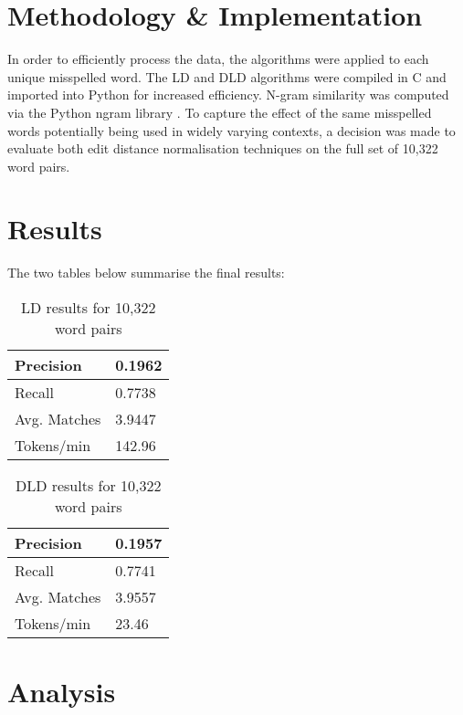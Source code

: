 \documentclass[11pt]{article}
\begin{document}
\section{Methodology \& Implementation}
In order to efficiently process the data, the algorithms were applied to each unique misspelled word.
The LD and DLD \cite{Pedro Rittner} algorithms were compiled in C and imported into Python for increased efficiency. N-gram
similarity was computed via the Python ngram library \cite{Poulter}. To capture the effect of the same misspelled words potentially being used in widely varying contexts, a decision was made to evaluate both edit distance normalisation techniques on the full set of 10,322 word pairs. 


\section{Results}
The two tables below summarise the final results:

\begin{table}[h]
\begin{center}
\begin{tabular}{|l|l|}
      \hline
      Precision & 0.1962\\
      \hline
      Recall & 0.7738\\
      \hline
      Avg. Matches & 3.9447\\
      \hline
      Tokens/min & 142.96\\
      \hline
\end{tabular}
\caption{LD results for 10,322 word pairs}\label{table1}
\end{center}
\end{table}


\begin{table}[h]
\begin{center}
\begin{tabular}{|l|l|}
      \hline
      Precision & 0.1957\\
      \hline
      Recall & 0.7741\\
      \hline
      Avg. Matches & 3.9557\\
      \hline
      Tokens/min & 23.46\\
      \hline
\end{tabular}
\caption{DLD results for 10,322 word pairs}\label{table2}
\end{center}
\end{table}

\section{Analysis}
\end{document}
